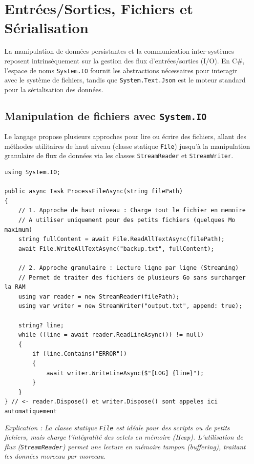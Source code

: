 \section{Entrées/Sorties, Fichiers et Sérialisation}

La manipulation de données persistantes et la communication inter-systèmes reposent intrinsèquement sur la gestion des flux d'entrées/sorties (I/O). En C\#, l'espace de noms \texttt{System.IO} fournit les abstractions nécessaires pour interagir avec le système de fichiers, tandis que \texttt{System.Text.Json} est le moteur standard pour la sérialisation des données.

\subsection{Manipulation de fichiers avec \texttt{System.IO}}

Le langage propose plusieurs approches pour lire ou écrire des fichiers, allant des méthodes utilitaires de haut niveau (classe statique \texttt{File}) jusqu'à la manipulation granulaire de flux de données via les classes \texttt{StreamReader} et \texttt{StreamWriter}.

\begin{lstlisting}[language={[Sharp]C}]
using System.IO;

public async Task ProcessFileAsync(string filePath)
{
    // 1. Approche de haut niveau : Charge tout le fichier en memoire
    // A utiliser uniquement pour des petits fichiers (quelques Mo maximum)
    string fullContent = await File.ReadAllTextAsync(filePath);
    await File.WriteAllTextAsync("backup.txt", fullContent);

    // 2. Approche granulaire : Lecture ligne par ligne (Streaming)
    // Permet de traiter des fichiers de plusieurs Go sans surcharger la RAM
    using var reader = new StreamReader(filePath);
    using var writer = new StreamWriter("output.txt", append: true);
    
    string? line;
    while ((line = await reader.ReadLineAsync()) != null)
    {
        if (line.Contains("ERROR"))
        {
            await writer.WriteLineAsync($"[LOG] {line}");
        }
    }
} // <- reader.Dispose() et writer.Dispose() sont appeles ici automatiquement
\end{lstlisting}
\textit{Explication : La classe statique \texttt{File} est idéale pour des scripts ou de petits fichiers, mais charge l'intégralité des octets en mémoire (Heap). L'utilisation de flux (\texttt{StreamReader}) permet une lecture en mémoire tampon (buffering), traitant les données morceau par morceau.}

